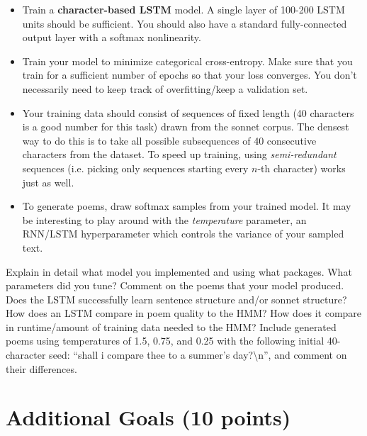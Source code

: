 \begin{itemize}
\item Train a \textbf{character-based LSTM} model. A single layer of 100-200 LSTM units should be sufficient. You should also have a standard fully-connected output layer with a softmax nonlinearity.

\item Train your model to minimize categorical cross-entropy. Make sure that you train for a sufficient number of epochs so that your loss converges. You don't necessarily need to keep track of overfitting/keep a validation set.

\item Your training data should consist of sequences of fixed length (40 characters is a good number for this task) drawn from the sonnet corpus. The densest way to do this is to take all possible subsequences of 40 consecutive characters from the dataset. To speed up training, using \emph{semi-redundant} sequences (i.e. picking only sequences starting every $n$-th character) works just as well.

\item To generate poems, draw softmax samples from your trained model. It may be interesting to play around with the \emph{temperature} parameter, an RNN/LSTM hyperparameter which controls the variance of your sampled text.
\end{itemize}



\begin{report}
    Explain in detail what model you implemented and using what packages. What parameters did you tune? Comment on the poems that your model produced. Does the LSTM successfully learn sentence structure and/or sonnet structure? How does an LSTM compare in poem quality to the HMM? How does it compare in runtime/amount of training data needed to the HMM? Include generated poems using temperatures of 1.5, 0.75, and 0.25 with the following initial 40-character seed: ``shall i compare thee to a summer's day?\textbackslash n'', and comment on their differences.
\end{report}

\section{Additional Goals (10 points)}

